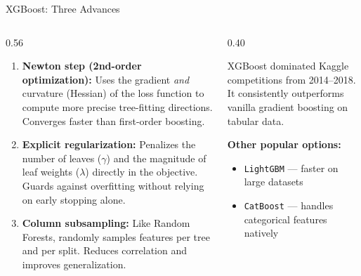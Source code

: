 \documentclass[aspectratio=169, 11pt]{beamer}
\begin{document}

\begin{frame}{XGBoost: Three Advances \parencite{Chen2016}}
  \begin{columns}[T]
    \begin{column}{0.56\textwidth}
      \begin{enumerate}
        \item \textbf{Newton step (2nd-order optimization):}
              Uses the gradient \emph{and} curvature (Hessian)
              of the loss function to compute more precise tree-fitting directions.
              Converges faster than first-order boosting.

        \item \textbf{Explicit regularization:}
              Penalizes the number of leaves ($\gamma$) and the magnitude
              of leaf weights ($\lambda$) directly in the objective.
              Guards against overfitting without relying on early stopping alone.

        \item \textbf{Column subsampling:}
              Like Random Forests, randomly samples features per tree and per split.
              Reduces correlation and improves generalization.
      \end{enumerate}
    \end{column}
    \begin{column}{0.40\textwidth}
      \begin{keybox}
        XGBoost dominated Kaggle competitions from 2014--2018.
        It consistently outperforms vanilla gradient boosting
        on tabular data.
      \end{keybox}
      \vspace{0.2cm}
      \textbf{Other popular options:}
      \begin{itemize}\small
        \item \texttt{LightGBM} --- faster on large datasets
        \item \texttt{CatBoost} --- handles categorical features natively
      \end{itemize}
    \end{column}
  \end{columns}
\end{frame}
\end{document}
